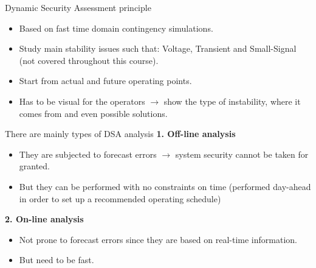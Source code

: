 \begin{frame}{Dynamic Security Assessment principle}
\begin{itemize}
    \item Based on fast time domain contingency simulations.
    \item Study main stability issues such that: Voltage, Transient and Small-Signal (not covered throughout this course).
    \item Start from actual and future operating points.
    \item Has to be visual for the operators $\rightarrow$ show the type of instability, where it comes from and even possible solutions.
\end{itemize}
\end{frame}

\begin{frame}{There are mainly types of DSA analysis}
\textbf{1. Off-line analysis}
\begin{itemize}
    \item They are subjected to forecast errors $\rightarrow$ system security cannot be taken for granted.
    \item But they can be performed with no constraints on time (performed day-ahead in order to set up a recommended operating schedule)
\end{itemize}

\textbf{2. On-line analysis}
\begin{itemize}
    \item Not prone to forecast errors since they are based on real-time information.
    \item But need to be fast.
\end{itemize}
\end{frame}

